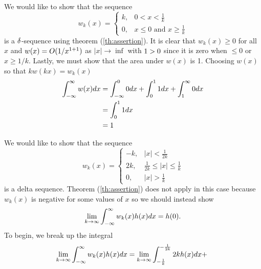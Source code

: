 \begin{example}
    We would like to show that the sequence
    \begin{equation*}
        w_k(x) = \begin{cases}
            k, &  0<x<\frac{1}{k}\\
            0, &x\leq 0 \text{ and } x \geq \frac{1}{k}
        \end{cases}
    \end{equation*}
    is a \(\delta\)-sequence using theorem (\ref{th:assertion}). It is clear that \(w_k(x)\geq 0\)  for all \(x\) and \(w(x)=O(1/x^{1+1})\) as \(|x| \rightarrow \inf\) with \(1>0\) since it is zero when \(\leq 0\) or \(x \geq 1/k\). Lastly, we must show that the area under \(w(x)\) is 1. Choosing \(w(x)\) so that \(kw(kx)=w_k(x)\)
    \begin{equation}
        \begin{split}
            \int_{-\infty}^{\infty} w(x) dx &= \int_{-\infty}^{0} 0 dx +\int_0^1 1 dx + \int_{1}^{\infty} 0 dx\\
            &=\int_0^1 1 dx\\
            &=1
        \end{split}
    \end{equation}
\end{example}

\begin{example}
    We would like to show that the sequence
    \begin{equation}
        w_k(x) = \begin{cases}
            -k, &|x|<\frac{1}{2k}\\
            2k, &\frac{1}{2k} \leq |x| \leq \frac{1}{k}\\
            0, &|x|> \frac{1}{k} 
        \end{cases}
    \end{equation}
    is a delta sequence. Theorem (\ref{th:assertion}) does not apply in this case because \(w_k(x)\) is negative for some values of \(x\) so we should instead show 
    \begin{equation}
        \lim_{k\to \infty}\int_{-\infty}^{\infty} w_k(x) h(x) dx = h(0).
    \end{equation}
    To begin, we break up the integral 
    \begin{equation}
        \lim_{k\to \inf}\intR w_k(x) h(x) dx = \lim_{k\to \inf}\int_{-\frac{1}{k}}^{-\frac{1}{2k}} 2kh(x)dx + \ 
    \end{equation}
\end{example}